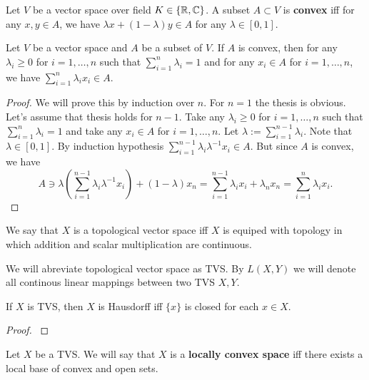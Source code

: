 \documentclass[main.tex]{subfiles}
\begin{document}
\begin{definition}
Let $V$ be a vector space over field $K\in\{\mathbb{R}, \mathbb{C}\}$. A subset $A \subset V$ is \textbf{convex} iff for any $x,y\in A$, we have $\lambda x + (1-\lambda)y\in A$ for any $\lambda\in [0, 1]$.
\end{definition}

\begin{theorem}
\label{full-convex-tvs}
Let $V$ be a vector space and $A$ be a subset of $V$. If $A$ is convex, then for any $\lambda_i \geq 0$ for $i=1, \dots, n$ such that $\sum_{i=1}^n \lambda_i = 1$ and for any $x_i\in A$ for $i=1, \dots, n$, we have $\sum_{i=1}^n \lambda_i x_i \in A$.
\end{theorem}
\begin{proof}
We will prove this by induction over $n$. For $n=1$ the thesis is obvious. Let's assume that thesis holds for $n-1$. Take any $\lambda_i \geq 0$ for $i=1, \dots, n$ such that $\sum_{i=1}^n \lambda_i = 1$ and take any $x_i\in A$ for $i=1, \dots, n$. Let $\lambda := \sum_{i=1}^{n - 1} \lambda_i$. Note that $\lambda\in [0, 1]$. By induction hypothesis $\sum_{i=1}^{n - 1} \lambda_i\lambda^{-1} x_i \in A$. But since $A$ is convex, we have
\begin{equation}
A \ni \lambda(\sum_{i=1}^{n - 1} \lambda_i\lambda^{-1} x_i) + (1-\lambda)x_n = \sum_{i=1}^{n - 1} \lambda_i x_i + \lambda_n x_n = \sum_{i=1}^{n} \lambda_i x_i. 
\end{equation}
\end{proof}

\begin{definition}
We say that $X$ is a topological vector space iff $X$ is equiped with topology in which addition and scalar multiplication are continuous.
\end{definition}

We will abreviate topological vector space as TVS. By $L(X, Y)$ we will denote all continous linear mappings between two TVS $X, Y$. 

\begin{theorem}
If $X$ is TVS, then $X$ is Hausdorff iff $\{x\}$ is closed for each $x\in X$. 
\end{theorem}
\begin{proof}
\cite[See][1.12]{rudin1991}
\end{proof}

\begin{definition}
Let $X$ be a TVS. We will say that $X$ is a \textbf{locally convex space} iff there exists a local base of convex and open sets.
\end{definition}
\end{document}
